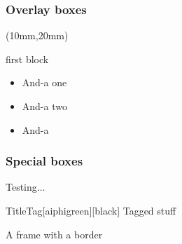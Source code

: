 \documentclass[mathserif, fleqn]{beamer}
\begin{document}
\begin{frame}\frametitle{Overlay boxes}
  \begin{textblock*}{60mm} (10mm,20mm)
    \begin{itembox}{first block}
      \begin{itemize}
      \item And-a one
      \item And-a two
      \item And-a
      \end{itemize}
    \end{itembox}
  \end{textblock*}


\end{frame}

\begin{frame}\frametitle{Special boxes}
  \begin{fancybox}{Testing...}
    \lipsum[2]
  \end{fancybox}

  \begin{tagbox}{Title}{Tag}[aiphigreen][black]
    Tagged stuff
  \end{tagbox}
\end{frame}

\begin{frame}[border=aiphipetrol]
  \begin{center}\huge
    A frame with a border
  \end{center}
\end{frame}
\end{document}
